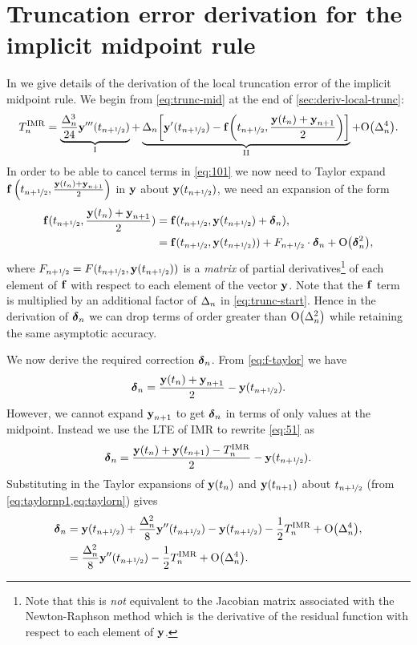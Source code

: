 \FloatBarrier
\chapter{Truncation error derivation for the implicit midpoint rule}
\label{sec:full-imr-lte-calculation}

In  we give details of the derivation of the local truncation error of the implicit midpoint rule.
We begin from \cref{eq:trunc-mid} at the end of \cref{sec:deriv-local-trunc}:
\begin{equation}
  \lte^\imr = \underbrace{\frac{\dtn^3}{24} \yvhf[''']}_{\text{I}}
  + \underbrace{\dtn\bigs{ \yvhf['] - \ffv{\thf, \frac{\yv(t_n) + \yv_{n+1}}{2}} }}_{\text{II}}
  + \order{\dtn^4}.
  \label{eq:101}
\end{equation}
In order to be able to cancel terms in \cref{eq:101} we now need to Taylor expand ${\boldsymbol{\mathrm{f}}}\left( t_{n+\nicefrac{1}{2}}, \frac{\boldsymbol{\mathrm{y}}(t_n) + \boldsymbol{\mathrm{y}}_{n+1}}{2} \right)$ in $\boldsymbol{\mathrm{y}}$ about $\boldsymbol{\mathrm{y}}(t_{n+\nicefrac{1}{2}})$, \ie we need an expansion of the form
\begin{equation}
  \begin{aligned}
    \fv(\thf, \frac{\yv(t_n) + \yv_{n+1}}{2}) &= \fv(\thf, \yvhf + \dyn), \\
    &= \fv(\thf, \yvhf) + \dfdyhf \cdot \dyn  + \order{\dyn^2},
    \label{eq:f-taylor}
  \end{aligned}
\end{equation}
where $F_{n+\nicefrac{1}{2}} = F(t_{n+\nicefrac{1}{2}}, \boldsymbol{\mathrm{y}}(t_{n+\nicefrac{1}{2}}))$ is a \emph{matrix} of partial derivatives\footnote{Note that this is \emph{not} equivalent to the Jacobian matrix associated with the Newton-Raphson method which is the derivative of the residual function with respect to each element of $\boldsymbol{\mathrm{y}}$.} of each element of ${\boldsymbol{\mathrm{f}}}$ with respect to each element of the vector $\boldsymbol{\mathrm{y}}$.
Note that the ${\boldsymbol{\mathrm{f}}}$ term is multiplied by an additional factor of $\Delta_{n}$ in \cref{eq:trunc-start}.
Hence in the derivation of $\mbox{\boldmath$\delta$}_{n}$ we can drop terms of order greater than $\mathrm{O}{\left( \Delta_{n}^2 \right)}$ while retaining the same asymptotic accuracy.

We now derive the required correction $\mbox{\boldmath$\delta$}_{n}$.
From \cref{eq:f-taylor} we have
\begin{equation}
  \dyn = \frac{\yv(t_n) + \yv_{n+1}}{2} - \yvhf.
  \label{eq:51}
\end{equation}
However, we cannot expand $\boldsymbol{\mathrm{y}}_{n+1}$ to get $\mbox{\boldmath$\delta$}_{n}$ in terms of only values at the midpoint.
Instead we use the LTE of IMR to rewrite \cref{eq:51} as
\begin{equation}
  \mbox{\boldmath$\delta$}_{n} = \frac{\boldsymbol{\mathrm{y}}(t_n) + \boldsymbol{\mathrm{y}}(t_{n+1}) - T_n^{\mathrm{IMR}}}{2} - \boldsymbol{\mathrm{y}}(t_{n+\nicefrac{1}{2}}).
\end{equation}
Substituting in the Taylor expansions of $\boldsymbol{\mathrm{y}}(t_n)$ and $\boldsymbol{\mathrm{y}}(t_{n+1})$ about $t_{n+\nicefrac{1}{2}}$ (from \cref{eq:taylornp1,eq:taylorn}) gives
\begin{equation}
  \begin{aligned}
    \dyn &= \yvhf + \frac{\dtn^2}{8} \yvhf[''] - \yvhf - \frac{1}{2} \lte^\imr + \order{\dtn^4},\\
    &= \frac{\dtn^2}{8} \yvhf[''] - \frac{1}{2} \lte^\imr + \order{\dtn^4}.
    \label{eq:dy-value}
  \end{aligned}
\end{equation}

